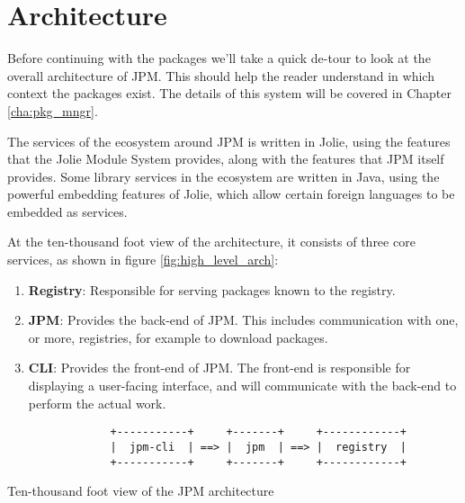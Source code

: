 \section{Architecture}
\label{sec:jpm_simple_arch}


Before continuing with the packages we'll take a quick de-tour to look at the
overall architecture of JPM. This should help the reader understand in which
context the packages exist. The details of this system will be covered in
Chapter \ref{cha:pkg_mngr}.

The services of the ecosystem around JPM is written in Jolie, using the
features that the Jolie Module System provides, along with the features that
JPM itself provides. Some library services in the ecosystem are written in
Java, using the powerful embedding features of Jolie, which allow certain
foreign languages to be embedded as services.

At the ten-thousand foot view of the architecture, it consists of three
core services, as shown in figure \ref{fig:high_level_arch}:

\begin{enumerate}

\item \textbf{Registry}: Responsible for serving packages known to the
registry.

\item \textbf{JPM}: Provides the back-end of JPM. This includes communication
with one, or more, registries, for example to download packages.

\item \textbf{CLI}: Provides the front-end of JPM. The front-end is responsible
for displaying a user-facing interface, and will communicate with the back-end
to perform the actual work.

\end{enumerate}

\begin{listing}[H]
\begin{verbatim}
                +-----------+     +-------+     +------------+
                |  jpm-cli  | ==> |  jpm  | ==> |  registry  |
                +-----------+     +-------+     +------------+
\end{verbatim}
\caption{Ten-thousand foot view of the JPM architecture}
\label{fig:high_level_arch}
\end{listing}

